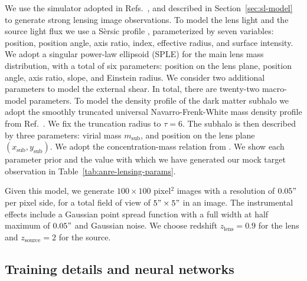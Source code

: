 \begin{subappendices}
We use the simulator adopted in Refs.~\cite{Coogan:2020yux, Coogan:2022cky, Montel:2022fhv}, and described in Section~\ref{sec:sl-model} to generate strong lensing image observations. To model the lens light and the source light flux we use a Sèrsic profile \cite{Sersic:1963aa}, parameterized by seven variables: position, position angle, axis ratio, index, effective radius, and surface intensity. We adopt a singular power-law ellipsoid (SPLE) \cite{Suyu:2008zp} for the main lens mass distribution, with a total of six parameters: position on the lens plane, position angle, axis ratio, slope, and Einstein radius. We consider two additional parameters to model the external shear. In total, there are twenty-two macro-model parameters. To model the density profile of the dark matter subhalo we adopt the smoothly truncated universal Navarro-Frenk-White mass density profile from Ref.~\cite{Baltz:2007vq}. We fix the truncation radius to $\tau=6$. The subhalo is then described by three parameters: virial mass $m_\mathrm{sub}$, and position on the lens plane $(x_\mathrm{sub}, y_\mathrm{sub})$. We adopt the concentration-mass relation from \cite{Correa:2015dva}. We show each parameter prior and the value with which we have generated our mock target observation in Table~\ref{tab:anre-lensing-params}.

Given this model, we generate $100 \times 100$ pixel$^2$ images with a resolution of $0.05"$ per pixel side, for a total field of view of $5" \times 5"$ in an image. The instrumental effects include a Gaussian point spread function with a full width at half maximum of $0.05"$ and Gaussian noise. We choose redshift $z_\mathrm{lens}=0.9$ for the lens and $z_\mathrm{source}=2$ for the source.

\subsection{Training details and neural networks}


\end{subappendices}
